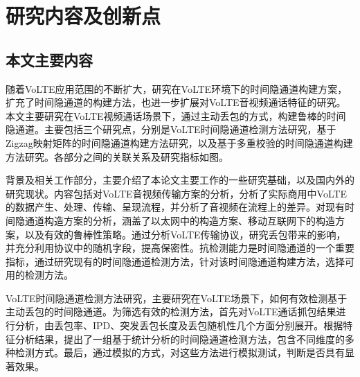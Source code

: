 \section{研究内容及创新点}
\label{sec:intro:work}

\subsection{本文主要内容}
\label{sec:intro:work:mainwork}

随着VoLTE应用范围的不断扩大，研究在VoLTE环境下的时间隐通道构建方案，扩充了时间隐通道的构建方法，也进一步扩展对VoLTE音视频通话特征的研究。本文主要研究在VoLTE视频通话场景下，通过主动丢包的方式，构建鲁棒的时间隐通道。主要包括三个研究点，分别是VoLTE时间隐通道检测方法研究，基于Zigzag映射矩阵的时间隐通道构建方法研究，以及基于多重校验的时间隐通道构建方法研究。各部分之间的关联关系及研究指标如图。


背景及相关工作部分，主要介绍了本论文主要工作的一些研究基础，以及国内外的研究现状。内容包括对VoLTE音视频传输方案的分析，分析了实际商用中VoLTE的数据产生、处理、传输、呈现流程，并分析了音视频在流程上的差异。对现有时间隐通道构造方案的分析，涵盖了以太网中的构造方案、移动互联网下的构造方案，以及有效的鲁棒性策略。通过分析VoLTE传输协议，研究丢包带来的影响，并充分利用协议中的随机字段，提高保密性。抗检测能力是时间隐通道的一个重要指标，通过研究现有的时间隐通道检测方法，针对该时间隐通道构建方法，选择可用的检测方法。

VoLTE时间隐通道检测方法研究，主要研究在VoLTE场景下，如何有效检测基于主动丢包的时间隐通道。为筛选有效的检测方法，首先对VoLTE通话抓包结果进行分析，由丢包率、IPD、突发丢包长度及丢包随机性几个方面分别展开。根据特征分析结果，提出了一组基于统计分析的时间隐通道检测方法，包含不同维度的多种检测方式。最后，通过模拟的方式，对这些方法进行模拟测试，判断是否具有显著效果。

